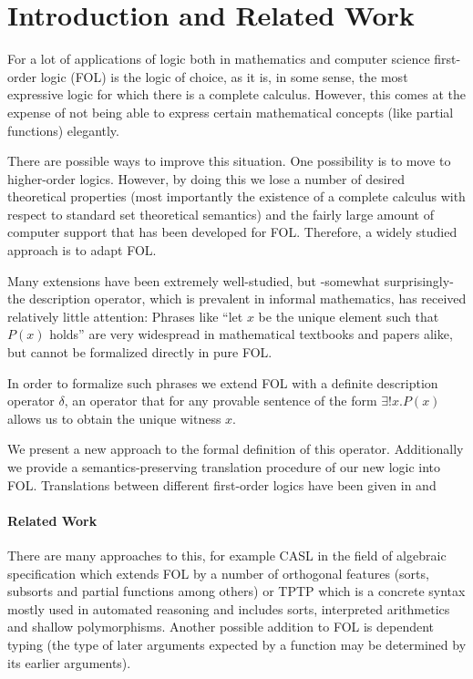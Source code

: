 \documentclass{article}
\begin{document}
\tableofcontents


\section{Introduction and Related Work}

For a lot of applications of logic both in mathematics and computer science first-order logic (FOL) is the logic of choice, as it is, in some sense, the most expressive logic for which there is a complete calculus.
However, this comes at the expense of not being able to express certain mathematical concepts (like partial functions) elegantly. 

There are possible ways to improve this situation. One possibility is to move to higher-order logics. However, by doing this we lose a number of desired theoretical properties (most importantly the existence of a complete calculus with respect to standard set theoretical semantics) and the fairly large amount of computer support that has been developed for FOL. Therefore, a widely studied approach is to adapt FOL.

Many extensions have been extremely well-studied,
but -somewhat surprisingly- the description operator, which is prevalent in informal mathematics, has received relatively little attention:
Phrases like ``let $x$ be the unique element such that $P(x)$ holds'' are very widespread in mathematical textbooks and papers alike, but cannot be formalized directly in pure FOL.

In order to formalize such phrases we  extend FOL with a definite description operator $\delta$, an operator that for any provable sentence of the form $\exists! x.P (x)$ allows us to obtain the unique witness $x$.

We present a new approach to the formal definition of this operator. Additionally we provide a semantics-preserving translation procedure of our new logic into FOL. Translations between different first-order logics have been given in \cite{casl} and \cite{dfoltrans}

\paragraph{Related Work}
There are many approaches to this, for example CASL\cite{casl} in the field of algebraic specification which extends FOL by a number of orthogonal features (sorts, subsorts and partial functions among others) or TPTP\cite{tptp} which is a concrete syntax mostly used in automated reasoning and includes sorts, interpreted arithmetics and shallow polymorphisms. 
Another possible addition to FOL is dependent typing\cite{dfol} (the type of later arguments expected by a function may be determined by its earlier arguments).
\end{document}
